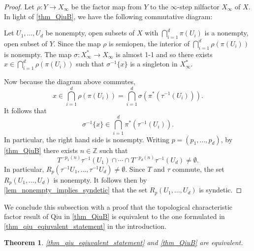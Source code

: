 \documentclass{article}
\theoremstyle{plain}
\newtheorem{theorem}[Theorem]{Theorem}
\theoremstyle{claim}
\theoremstyle{definition}
\theoremstyle{plain}
\theoremstyle{plain}
\newcommand{\Z}{\mathbb{Z}}
\newcommand{\1}{\boldsymbol{1}}
\begin{document}
\begin{proof}
Let $\rho: Y \to X_{\infty}$ be the factor map from $Y$ to the $\infty$-step nilfactor $X_{\infty}$ of $X$. In light of \cref{thm_QiuB}, we have the following commutative diagram:
\begin{center}
\end{center}
Let $U_1, \ldots, U_d$ be nonempty, open subsets of $X$ with $\bigcap_{i=1}^d \pi(U_i)$ is a nonempty, open subset of $Y$. Since the map $\rho$ is semiopen, the interior of $\bigcap_{i=1}^d \rho(\pi(U_i))$ is nonempty. The map $\sigma: X_{\infty}^* \to X_{\infty}$ is almost 1-1 and so there exists $x \in \bigcap_{i=1}^d \rho(\pi(U_i))$ such that $\sigma^{-1}\{x\}$ is a singleton in $X_{\infty}^*$.

Now because the diagram above commutes,
\[
    x \in \bigcap_{i=1}^d \rho(\pi(U_i)) =\bigcap_{i=1}^d \sigma(\pi^*(\tau^{-1}(U_i))).
\]
It follows that 
\[
    \sigma^{-1}\{x\} \in \bigcap_{i=1}^d \pi^*(\tau^{-1}(U_i)).
\]
In particular, the right hand side is nonempty. Writing $p=(p_1,\ldots,p_d)$, by \cref{thm_QiuB} there exists $n \in \Z$ such that
\[
    T^{-p_1(n)} \tau^{-1}(U_1) \cap \cdots \cap T^{-p_d(n)} \tau^{-1}(U_d) \neq \emptyset.
\]
In particular, $R_p(\tau^{-1} U_1, \ldots, \tau^{-1} U_d) \neq \emptyset$. Since $T$ and $\tau$ commute, the set $R_p(U_1, \ldots, U_d)$ is nonempty.  It follows then by \cref{lem_nonempty_implies_syndetic} that the set $R_p(U_1, \ldots, U_d)$ is syndetic.
\end{proof}

We conclude this subsection with a proof that the topological characteristic factor result of Qiu in \cref{thm_QiuB} is equivalent to the one formulated in \cref{thm_qiu_eqiuvalent_statement} in the introduction.




\begin{theorem}
\label{thm_qiu_equivalent}
\cref{thm_qiu_eqiuvalent_statement} and 
\cref{thm_QiuB} are equivalent.
\end{theorem}
\end{document}
